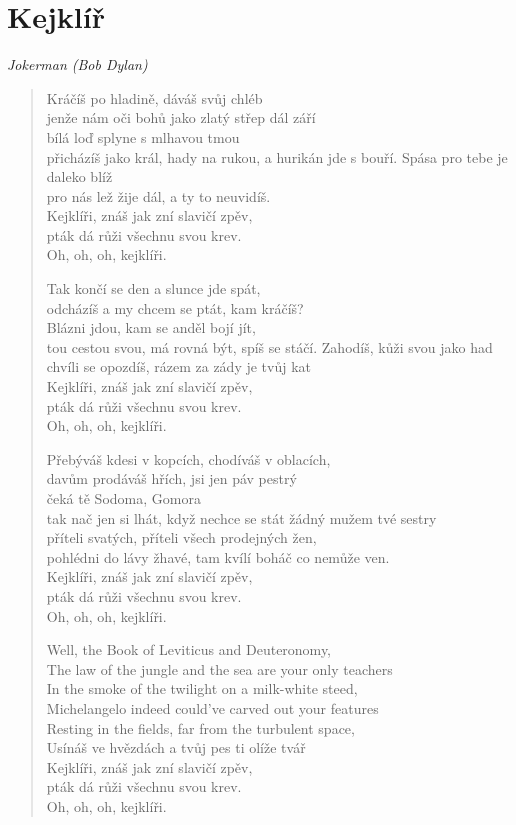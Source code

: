 \section*{Kejklíř}

\textit{Jokerman (Bob Dylan)}

\begin{verse}
Kráčíš po hladině, dáváš svůj chléb\\
jenže nám oči bohů jako zlatý střep dál září\\ 
bílá loď splyne s mlhavou tmou\\
přicházíš jako král, hady na rukou, a hurikán jde s bouří. 
Spása pro tebe je daleko blíž\\
pro nás lež žije dál, a ty to neuvidíš. \\
Kejklíři, znáš jak zní slavičí zpěv,\\
pták dá růži všechnu svou krev. \\
Oh, oh, oh, kejklíři.

Tak končí se den a slunce jde spát, \\
odcházíš a my chcem se ptát, kam kráčíš? \\
Blázni jdou, kam se anděl bojí jít, \\
tou cestou svou, má rovná být, spíš se stáčí.
Zahodíš, kůži svou jako had \\
chvíli se opozdíš, rázem za zády je tvůj kat \\
Kejklíři, znáš jak zní slavičí zpěv,\\
pták dá růži všechnu svou krev. \\
Oh, oh, oh, kejklíři.

Přebýváš kdesi v kopcích, chodíváš v oblacích, \\
davům prodáváš hřích, jsi jen páv pestrý \\
čeká tě Sodoma, Gomora \\
tak nač jen si lhát, když nechce se stát žádný mužem tvé sestry  \\
příteli svatých, příteli všech prodejných žen, \\
pohlédni do lávy žhavé, tam kvílí boháč co nemůže ven. \\
Kejklíři, znáš jak zní slavičí zpěv,\\
pták dá růži všechnu svou krev. \\
Oh, oh, oh, kejklíři.

Well, the Book of Leviticus and Deuteronomy, \\
The law of the jungle and the sea are your only teachers \\
In the smoke of the twilight on a milk-white steed, \\
Michelangelo indeed could've carved out your features \\
Resting in the fields, far from the turbulent space, \\
Usínáš ve hvězdách a tvůj pes ti olíže tvář \\
Kejklíři, znáš jak zní slavičí zpěv,\\
pták dá růži všechnu svou krev. \\
Oh, oh, oh, kejklíři.


\end{verse}

